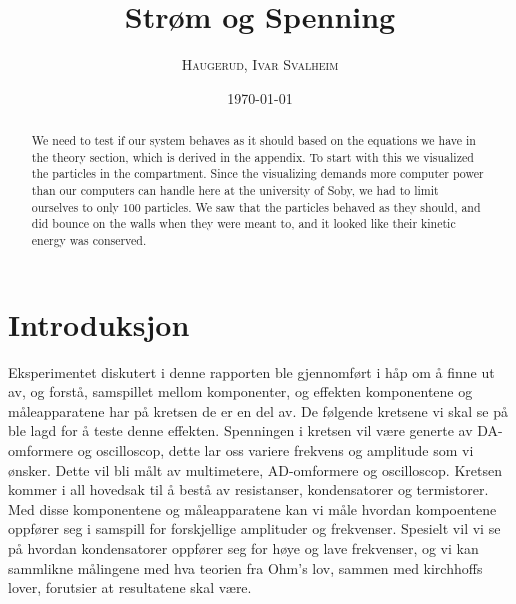 \documentclass[%
 reprint,
 amsmath,amssymb,
 aps,
]{revtex4-1}
\begin{document}

\title{Strøm og Spenning}

\author{\textsc{Haugerud, Ivar Svalheim}}
%

\date{\today}

\begin{abstract}
We need to test if our system behaves as it should based on the equations we have in the theory section, which is derived in the appendix. To start with this we visualized the particles in the compartment. Since the visualizing demands more computer power than our computers can handle here at the university of Soby, we had to limit ourselves to only $100$ particles. We saw that the particles behaved as they should, and did bounce on the walls when they were meant to, and it looked like their kinetic energy was conserved.
\end{abstract}

\maketitle

\section{\label{introduksjon}Introduksjon}
Eksperimentet diskutert i denne rapporten ble gjennomført i håp om å finne ut av, og forstå, samspillet mellom komponenter, og effekten komponentene og måleapparatene har på kretsen de er en del av. De følgende kretsene vi skal se på ble lagd for å teste denne effekten. Spenningen i kretsen vil være generte av DA-omformere og oscilloscop, dette lar oss variere frekvens og amplitude som vi ønsker. Dette vil bli målt av multimetere, AD-omformere og oscilloscop. Kretsen kommer i all hovedsak til å bestå av resistanser, kondensatorer og termistorer. Med disse komponentene og måleapparatene kan vi måle hvordan kompoentene oppfører seg i samspill for forskjellige amplituder og frekvenser. Spesielt vil vi se på hvordan kondensatorer oppfører seg for høye og lave frekvenser, og vi kan sammlikne målingene med hva teorien fra Ohm's lov, sammen med kirchhoffs lover, forutsier at resultatene skal være.
\end{document}
